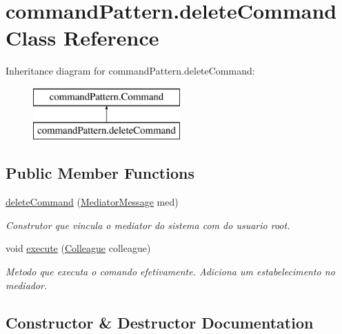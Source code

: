 \hypertarget{classcommand_pattern_1_1delete_command}{}\section{command\+Pattern.\+delete\+Command Class Reference}
\label{classcommand_pattern_1_1delete_command}
Inheritance diagram for command\+Pattern.\+delete\+Command\+:\begin{figure}[H]
\begin{center}
\leavevmode
\includegraphics[height=2.000000cm]{classcommand_pattern_1_1delete_command}
\end{center}
\end{figure}
\subsection*{Public Member Functions}
\begin{DoxyCompactItemize}
\item 
\mbox{\hyperlink{classcommand_pattern_1_1delete_command_ac7ed2522a341080c1d22a5f9afb169cc}{delete\+Command}} (\mbox{\hyperlink{classmediator_pattern_1_1_mediator_message}{Mediator\+Message}} med)
\begin{DoxyCompactList}\small\item\em Construtor que vincula o mediator do sistema com do usuario root. \end{DoxyCompactList}\item 
void \mbox{\hyperlink{classcommand_pattern_1_1delete_command_ab05d76bc592e6e3fb795ee6eb9956b18}{execute}} (\mbox{\hyperlink{classmediator_pattern_1_1_colleague}{Colleague}} colleague)
\begin{DoxyCompactList}\small\item\em Metodo que executa o comando efetivamente. Adiciona um estabelecimento no mediador. \end{DoxyCompactList}\end{DoxyCompactItemize}


\subsection{Constructor \& Destructor Documentation}
\mbox{\label{classcommand_pattern_1_1delete_command_ac7ed2522a341080c1d22a5f9afb169cc}} 

